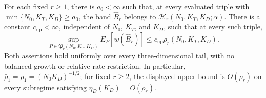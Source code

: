 For each fixed \(r\ge1\), there is \(a_0<\infty\) such that, at every evaluated triple with \(\min\{N_0,K_T,K_D\}\ge a_0\), the band \(\widehat B_r\) belongs to \(\mathcal H_r(N_0,K_T,K_D;\alpha)\). There is a constant \(c_{\mathrm{up}}<\infty\), independent of \(N_0\), \(K_T\), and \(K_D\), such that at every such triple,
\[
 \sup_{P\in\mathfrak P_r(N_0,K_T,K_D)}E_P[w(\widehat B_r)]
 \le c_{\mathrm{up}}\bar\rho_r(N_0,K_T,K_D).
\]
Both assertions hold uniformly over every three-dimensional tail, with no balanced-growth or relative-rate restriction. In particular, \(\bar\rho_1=\rho_1=(N_0K_D)^{-1/2}\); for fixed \(r\ge2\), the displayed upper bound is \(O(\rho_r)\) on every subregime satisfying \(\eta_D(K_D)=O(\rho_r)\).